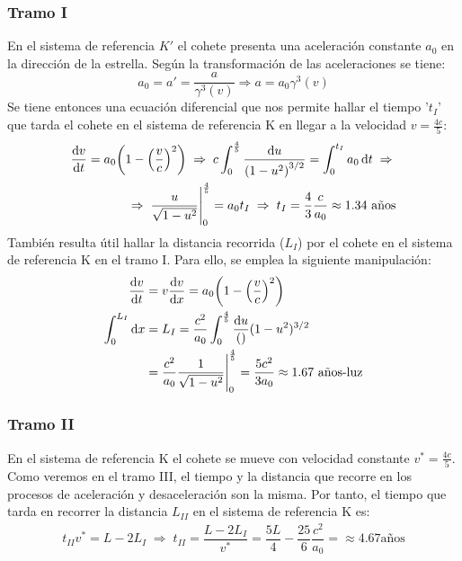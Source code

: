 \documentclass[11pt]{article}
\begin{document}
\subsubsection*{Tramo I}
En el sistema de referencia $K'$ el cohete presenta una aceleración constante $a_0$ en la dirección de la estrella. Según la transformación de las aceleraciones se tiene:
\begin{equation}
	\label{Transformación de Velocidades}
	a_0 = a' = \dfrac{a}{\gamma^3(v)} \Rightarrow a = a_0 \gamma^3(v)
\end{equation}
Se tiene entonces una ecuación diferencial que nos permite hallar el tiempo '$t_I$' que tarda el cohete en el sistema de referencia K en llegar a la velocidad $v = \frac{4c}{5}$:
\begin{align}
	\dv{v}{t} = a_0 \qty (1  - \qty(\dfrac{v}{c})^2) \;\Rightarrow\; c\int_{0}^{\frac{4}{5}} \dfrac{\dd{u}}{\qty(1-u^2)^{3/2}} = \int_{0}^{t_I} a_0 \dd{t} \;\Rightarrow\;\nonumber \\
	\Rightarrow\; \dfrac{u}{\sqrt{1-u^2}}\Bigg|_{0}^{\frac{4}{5}} = a_0 t_I \;\Rightarrow\; t_I = \dfrac{4}{3} \dfrac{c}{a_0} \approx 1.34 \textrm{ años} \label{Tiempo I}
\end{align}
También resulta útil hallar la distancia recorrida ($L_I$) por el cohete en el sistema de referencia K en el tramo I. Para ello, se emplea la siguiente manipulación:
\begin{align}
	\dv{v}{t}            & = v\dv{v}{x} = a_0 \qty(1 - \qty(\dfrac{v}{c})^2) \nonumber\\
	\int_{0}^{L_I}\dd{x} & = L_I = \dfrac{c^2}{a_0} \int_{0}^{\frac{4}{5}} \dfrac{\dd{u}}\qty(1-u^2)^{3/2}\nonumber\\
	                     & = \dfrac{c^2}{a_0} \dfrac{1}{\sqrt{1-u^2}}\Bigg|_{0}^{\frac{4}{5}} = \dfrac{5c^2}{3a_0}  \approx 1.67 \textrm{ años-luz} \label{Distancia I}
\end{align}
\subsubsection*{Tramo II}
En el sistema de referencia K el cohete se mueve con velocidad constante $v^* = \frac{4c}{5}$. Como veremos en el tramo III, el tiempo y la distancia que recorre en los procesos de aceleración y desaceleración son la misma. Por tanto, el tiempo que tarda en recorrer la distancia $L_{II}$ en el sistema de referencia K es:
\begin{align}
    t_{II}v^* = L - 2L_I \;\Rightarrow\; t_{II} = \dfrac{L - 2L_I}{v^*} = \dfrac{5L}{4} - \dfrac{25}{6}\dfrac{c^2}{a_0}=\approx 4.67 \textrm{años} \label{Tiempo II} 
\end{align}
\end{document}
